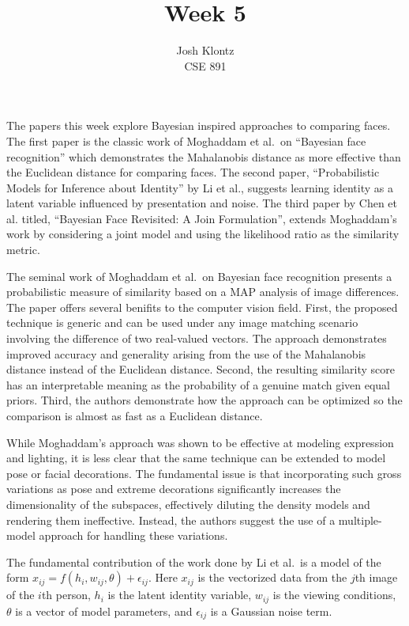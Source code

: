 \documentclass[12pt]{article}
\begin{document}
 
\title{Week 5}
\author{Josh Klontz\\CSE 891}
 
\maketitle
 
The papers this week explore Bayesian inspired approaches to comparing faces.
The first paper is the classic work of Moghaddam et al.\ on ``Bayesian face recognition'' which demonstrates the Mahalanobis distance as more effective than the Euclidean distance for comparing faces.
The second paper, ``Probabilistic Models for Inference about Identity'' by Li et al., suggests learning identity as a latent variable influenced by presentation and noise.
The third paper by Chen et al. titled, ``Bayesian Face Revisited: A Join Formulation'', extends Moghaddam's work by considering a joint model and using the likelihood ratio as the similarity metric.
\par
The seminal work of Moghaddam et al.\ on Bayesian face recognition presents a probabilistic measure of similarity based on a MAP analysis of image differences.
The paper offers several benifits to the computer vision field.
First, the proposed technique is generic and can be used under any image matching scenario involving the difference of two real-valued vectors.
The approach demonstrates improved accuracy and generality arising from the use of the Mahalanobis distance instead of the Euclidean distance.
Second, the resulting similarity score has an interpretable meaning as the probability of a genuine match given equal priors.
Third, the authors demonstrate how the approach can be optimized so the comparison is almost as fast as a Euclidean distance.
\par
While Moghaddam's approach was shown to be effective at modeling expression and lighting, it is less clear that the same technique can be extended to model pose or facial decorations.
The fundamental issue is that incorporating such gross variations as pose and extreme decorations significantly increases the dimensionality of the subspaces, effectively diluting the density models and rendering them ineffective.
Instead, the authors suggest the use of a multiple-model approach for handling these variations.
\par
The fundamental contribution of the work done by Li et al.\ is a model of the form $x_{ij}=f(h_i,w_{ij},\theta)+\epsilon_{ij}$.
Here $x_{ij}$ is the vectorized data from the $j$th image of the $i$th person, $h_i$ is the latent identity variable, $w_{ij}$ is the viewing conditions, $\theta$ is a vector of model parameters, and $\epsilon_{ij}$ is a Gaussian noise term.
\end{document}
